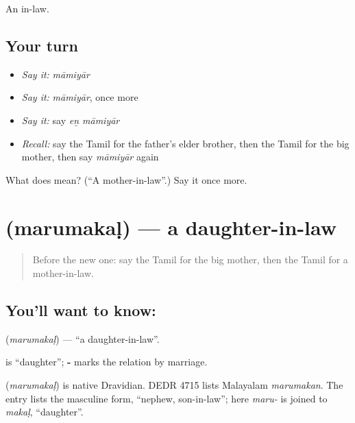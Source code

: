 \begin{grammarlens}[title={What you've built}]
An in-law.
\end{grammarlens}

\subsection*{Your turn}
\begin{itemize}
\raggedright
  \item \emph{Say it:} \emph{māmiyār}
  \item \emph{Say it:} \emph{māmiyār}, once more
  \item \emph{Say it:} say \emph{eṉ māmiyār}
  \item \emph{Recall:} say the Tamil for the father's elder brother, then the Tamil for the big mother, then say \emph{māmiyār} again
\end{itemize}

\begin{tcolorbox}[breakable,colback=teal!4,colframe=teal!35!black,title={Before you move on}]
What does  mean? (\textquotedblleft{}A mother-in-law\textquotedblright{}.) Say it once more.
\end{tcolorbox}
\section[\texorpdfstring{\ta{மருமகள்} (marumakaḷ)}{மருமகள் (marumakaḷ)}]{ (marumakaḷ) — a daughter-in-law}

\label{lesson:TA-C102-daughterinlaw}



\begin{quote}
Before the new one: say the Tamil for the big mother, then the Tamil for a mother-in-law.
\end{quote}

\subsection*{You'll want to know: }
\textbf{} (\emph{marumakaḷ}) — \textquotedblleft{}a daughter-in-law\textquotedblright{}.

\textbf{} is \textquotedblleft{}daughter\textquotedblright{}; \textbf{-} marks the relation by marriage.

\begin{cousinweb}
\textbf{} (\emph{marumakaḷ}) is native Dravidian. DEDR 4715 lists Malayalam \emph{marumakan}. The entry lists the masculine form, \textquotedblleft{}nephew, son-in-law\textquotedblright{}; here \emph{maru-} is joined to \emph{makaḷ}, \textquotedblleft{}daughter\textquotedblright{}.
\end{cousinweb}

